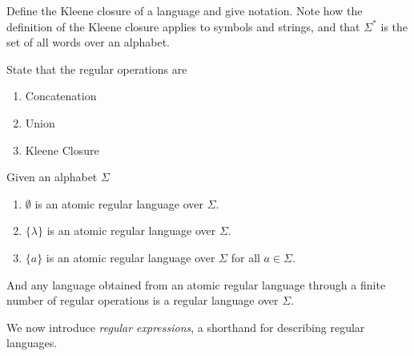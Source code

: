 \documentclass{bcthesis}
\begin{document}
	\iffalse
	\begin{definition}[Positive Closure]
		Define the positive closure of a set and give notation. 
		Also give notation and meaning for the set of nonempty words over an alphabet.
		\note{I'm not sure I actually need to include this.}
	\end{definition}
	\fi

	\begin{definition}
		Define the Kleene closure of a language and give notation.
		Note how the definition of the Kleene closure applies to symbols and strings, and that $\Sigma^*$ is the set of all words over an alphabet.
	\end{definition}

	\begin{definition}
		State that the regular operations are 
		\begin{enumerate}[label=(\roman*), itemsep = -0.3 ex]
			\item Concatenation
			\item Union
			\item Kleene Closure
		\end{enumerate}
	\end{definition}

	\begin{definition}
		Given an alphabet $\Sigma$
		\begin{enumerate}[label=(\roman*), itemsep = -0.3 ex]
			\item $\emptyset$ is an atomic regular language over $\Sigma$.
			\item $\{ \lambda \}$ is an atomic regular language over $\Sigma$.
			\item $\{ a \}$ is an atomic regular language over $\Sigma$ for all $a \in \Sigma$.
		\end{enumerate}
		And any language obtained from an atomic regular language through a finite number of regular operations is a regular language over $\Sigma$.
	\end{definition}

	We now introduce \textit{regular expressions}, a shorthand for describing regular languages.
\end{document}
